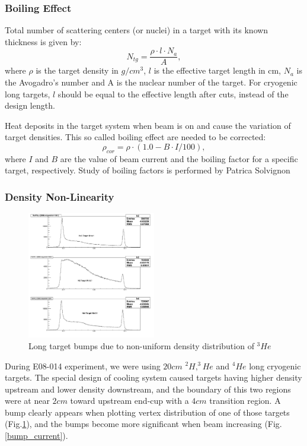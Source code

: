 \documentclass[a4paper,10.5pt]{report}
\begin{document}
\subsubsection{Boiling Effect}
Total number of scattering centers (or nuclei) in a target with its known thickness is given by:
\begin{equation}
 N_{tg} = \frac{\rho\cdot l \cdot N_{a}}{A},
 \label{eq_ntg}
\end{equation}
where $\rho$ is the target density in $g/cm^{3}$, $l$ is the effective target length in cm, $N_{a}$ is the Avogadro's number and A is the nuclear number of the target. For cryogenic long targets, $l$ should be equal to the effective length after cuts, instead of the design length.

Heat deposits in the target system when beam is on and cause the variation of target densities. This so called boiling effect are needed to be corrected:
\begin{equation}
  \rho_{cor} = \rho \cdot (1.0 - B \cdot I /100),
   \label{eq_tgrho}
\end{equation}
where $I$ and $B$ are the value of beam current and the boiling factor for a specific target, respectively. Study of boiling factors is performed by Patrica Solvignon %

\subsubsection{Density Non-Linearity}
\begin{figure}[ht]
 \begin{center}
   \includegraphics[type=pdf, ext=.pdf,read=.pdf,width=0.50\textwidth]{../figures/target/L_Cryo_RPZ}
  \caption[Long target bumps due]{Long target bumps due to non-uniform density distribution of $^{3}He$}
  \label{he3_bump}
 \end{center}
\end{figure}
During E08-014 experiment, we were using $20cm$ $^{2}H, ^{3}He$ and $^{4}He$ long cryogenic targets. The special design of cooling system caused targets having higher density upstream and lower density downstream, and the boundary of this two regions were at near $2cm$ toward upstream end-cup with a $4cm$ transition region. A bump clearly appears when plotting vertex distribution of one of those targets (Fig.\ref{he3_bump}), and the bumps become more significant when beam increasing (Fig.\ref{bump_current}).
\end{document}
